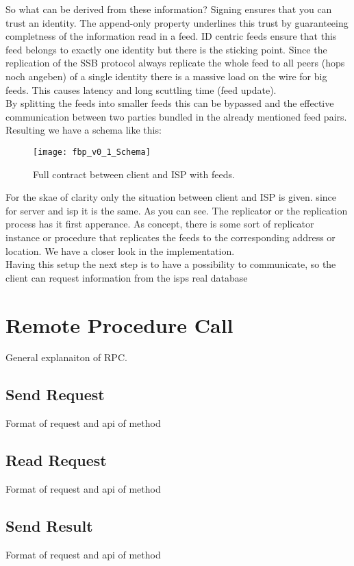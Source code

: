 So what can be derived from these information? Signing ensures that you can trust an identity. The append-only property underlines this trust by guaranteeing completness of the information read in a feed. ID centric feeds ensure that this feed belongs to exactly one identity but there is the sticking point. Since the replication of the SSB protocol always replicate the whole feed to all peers (hops noch angeben) of a single identity there is a massive load on the wire for big feeds. This causes latency and long scuttling time (feed update). \\
By splitting the feeds into smaller feeds this can be bypassed and the effective communication between two parties bundled in the already mentioned feed pairs. Resulting we have a schema like this:
\begin{figure}
    \centering
    \texttt{[image: fbp\_v0\_1\_Schema]}
    \caption{Full contract between client and ISP with feeds.}
    \label{fig:contract_cli_isp}
\end{figure}
For the skae of clarity only the situation between client and ISP is given. since for server and isp it is the same. As you can see. The replicator or the replication process has it first apperance. As concept, there is some sort of replicator instance or procedure that replicates the feeds to the corresponding address or location. We have a closer look in the implementation.\\

Having this setup the next step is to have a possibility to communicate, so the client can request information from the isps real database

\pagebreak
\section{Remote Procedure Call}
General explanaiton of RPC.

\subsection{Send Request}
Format of request and api of method
\subsection{Read Request}
Format of request and api of method
\subsection{Send Result}
Format of request and api of method
